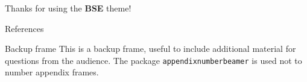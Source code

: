 \documentclass{beamer}
\begin{document}
    \begin{frame}[focus]
        Thanks for using the \textbf{BSE} theme!
    \end{frame}
    
    \appendix
    \begin{frame}{References}
        \nocite{*}
        
    \end{frame}
    
    \begin{frame}{Backup frame}
        This is a backup frame, useful to include additional material for questions from the audience.
        \vfill
        The package \texttt{appendixnumberbeamer} is used not to number appendix frames.
    \end{frame}
\end{document}
